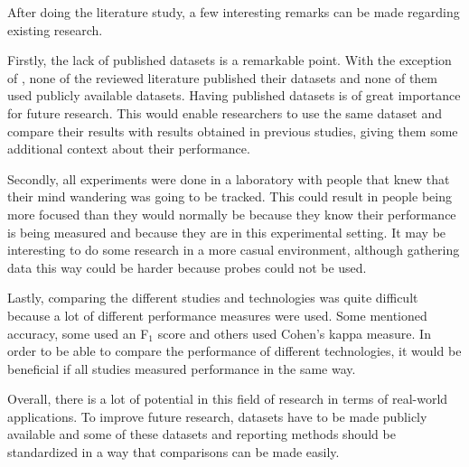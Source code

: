 After doing the literature study, a few interesting remarks can be made regarding existing research.

Firstly, the lack of published datasets is a remarkable point. With the exception of \cite{Zhao2017ScalableApproach}, none of the reviewed literature published their datasets and none of them used publicly available datasets. Having published datasets is of great importance for future research. This would enable researchers to use the same dataset and compare their results with results obtained in previous studies, giving them some additional context about their performance.

Secondly, all experiments were done in a laboratory with people that knew that their mind wandering was going to be tracked. This could result in people being more focused than they would normally be because they know their performance is being measured and because they are in this experimental setting. It may be interesting to do some research in a more casual environment, although gathering data this way could be harder because probes could not be used.

Lastly, comparing the different studies and technologies was quite difficult because a lot of different performance measures were used. Some mentioned accuracy, some used an F$_1$ score and others used Cohen's kappa measure. In order to be able to compare the performance of different technologies, it would be beneficial if all studies measured performance in the same way.  

Overall, there is a lot of potential in this field of research in terms of real-world applications. To improve future research, datasets have to be made publicly available and some of these datasets and reporting methods should be standardized in a way that comparisons can be made easily.